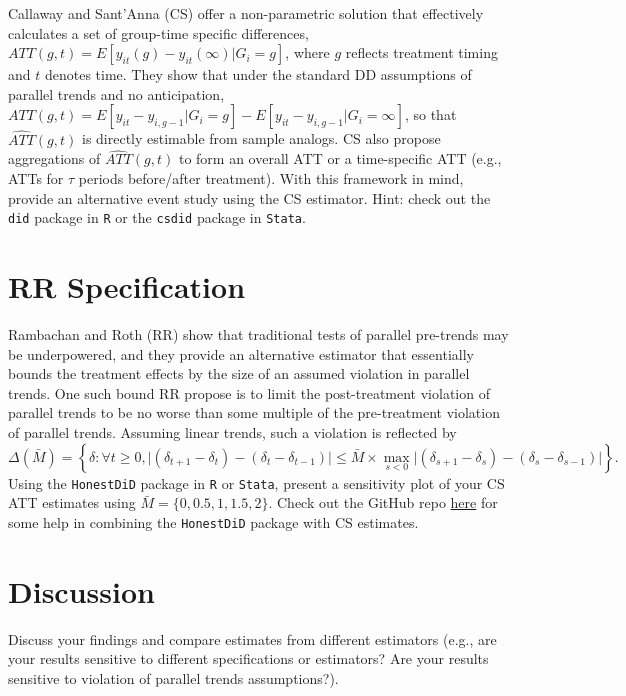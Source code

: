 \documentclass[
]{article}
\begin{document}
Callaway and Sant'Anna (CS) offer a non-parametric solution that
effectively calculates a set of group-time specific differences,
\(ATT(g,t)= E[y_{it}(g) - y_{it}(\infty) | G_{i}=g]\), where \(g\)
reflects treatment timing and \(t\) denotes time. They show that under
the standard DD assumptions of parallel trends and no anticipation,
\(ATT(g,t) = E[y_{it} - y_{i, g-1} | G_{i}=g] - E[y_{it} - y_{i,g-1} | G_{i} = \infty]\),
so that \(\hat{ATT}(g,t)\) is directly estimable from sample analogs. CS
also propose aggregations of \(\hat{ATT}(g,t)\) to form an overall ATT
or a time-specific ATT (e.g., ATTs for \(\tau\) periods before/after
treatment). With this framework in mind, provide an alternative event
study using the CS estimator. Hint: check out the \texttt{did} package
in \texttt{R} or the \texttt{csdid} package in \texttt{Stata}.

\hypertarget{rr-specification}{%
\section{RR Specification}\label{rr-specification}}

Rambachan and Roth (RR) show that traditional tests of parallel
pre-trends may be underpowered, and they provide an alternative
estimator that essentially bounds the treatment effects by the size of
an assumed violation in parallel trends. One such bound RR propose is to
limit the post-treatment violation of parallel trends to be no worse
than some multiple of the pre-treatment violation of parallel trends.
Assuming linear trends, such a violation is reflected by
\[\Delta(\bar{M}) = \left\{ \delta : \forall t \geq 0, \lvert (\delta_{t+1} - \delta_{t}) - (\delta_{t} - \delta_{t-1}) \rvert \leq \bar{M} \times \max_{s<0} \lvert (\delta_{s+1} - \delta_{s}) - (\delta_{s} - \delta_{s-1}) \rvert \right\}.\]
Using the \texttt{HonestDiD} package in \texttt{R} or \texttt{Stata},
present a sensitivity plot of your CS ATT estimates using
\(\bar{M} = \{0, 0.5, 1, 1.5, 2\}\). Check out the GitHub repo
\href{https://github.com/pedrohcgs/CS_RR}{here} for some help in
combining the \texttt{HonestDiD} package with CS estimates.

\hypertarget{discussion}{%
\section{Discussion}\label{discussion}}

Discuss your findings and compare estimates from different estimators
(e.g., are your results sensitive to different specifications or
estimators? Are your results sensitive to violation of parallel trends
assumptions?).
\end{document}
